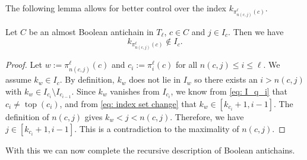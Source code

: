 \documentclass{preprint}
\newcommand{\topmap}{\operatorname{top}}
\theoremstyle{definition}
\begin{document}
The following lemma allows for better control over the index $k_{\pi_{n(c,j)}^\ell(c)}$.

\begin{lemma}\label{lem: forwarding k}
    Let $C$ be an almost Boolean antichain in $T_\ell$, $c \in C$ and $j \in I_c$. Then we have
    \[
        k_{\pi_{n(c,j)}^\ell(c)} \notin I_c.
    \]
\end{lemma}
\begin{proof}
    Let $w := \pi_{n(c,j)}^\ell(c)$ and $c_i := \pi_i^\ell(c)$ for all $n(c,j) \leq i \leq \ell$. We assume $k_w \in I_c$. By definition, $k_w$ does not lie in $I_w$ so there exists an $i > n(c,j)$ with $k_w \in I_{c_i} \setminus I_{c_{i-1}}$. Since $k_w$ vanishes from $I_{c_i}$, we know from \eqref{eq: I_q_i} that $c_i \neq \topmap(c_i)$, and from \eqref{eq: index set change} that $k_w \in [k_{c_i} + 1, i-1]$. The definition of $n(c,j)$ gives $k_w < j < n(c,j)$. Therefore, we have $j \in [k_{c_i} + 1, i - 1]$. This is a contradiction to the maximality of $n(c,j)$.
\end{proof}

With this we can now complete the recursive description of Boolean antichains.
\end{document}
